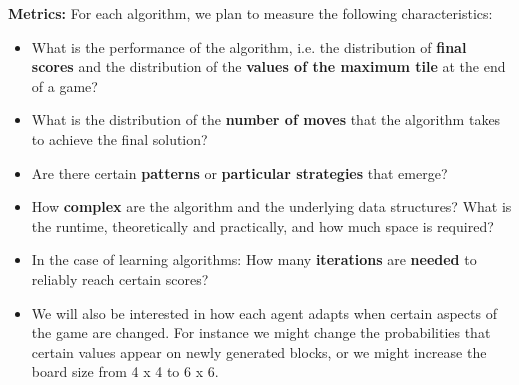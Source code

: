 \documentclass[11pt]{article}
\begin{document}
\noindent \textbf{Metrics: } For each algorithm, we plan to measure the following characteristics:
\begin{itemize}
\itemsep-0.1em
	\item What is the performance of the algorithm, i.e. the distribution of \textbf{final scores} and the distribution of the \textbf{values of the maximum tile} at the end of a game?
	\item What is the distribution of the \textbf{number of moves} that the algorithm takes to achieve the final solution?
	\item Are there certain \textbf{patterns} or \textbf{particular strategies} that emerge? 
	\item How \textbf{complex} are the algorithm and the underlying data structures? What is the runtime, theoretically and practically, and how much space is required?
	\item In the case of learning algorithms: How many \textbf{iterations} are \textbf{needed} to reliably reach certain scores?
	\item We will also be interested in how each agent adapts when certain aspects of the game are changed.  For instance we might change the probabilities that certain values appear on newly generated blocks, or we might increase the board size from 4 x 4 to 6 x 6.
\end{itemize}
\end{document}
